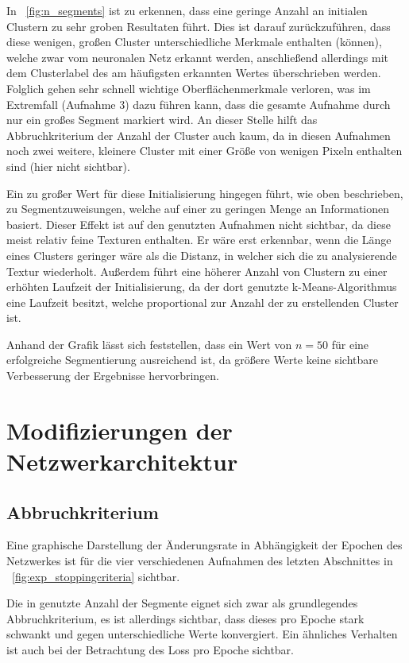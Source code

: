 In \figurename~\ref{fig:n_segments} ist zu erkennen, dass eine geringe Anzahl an initialen Clustern zu sehr groben Resultaten führt. Dies ist darauf zurückzuführen, dass diese wenigen, großen Cluster unterschiedliche Merkmale enthalten (können), welche zwar vom neuronalen Netz erkannt werden, anschließend allerdings mit dem Clusterlabel des am häufigsten erkannten Wertes überschrieben werden. Folglich gehen sehr schnell wichtige Oberflächenmerkmale verloren, was im Extremfall (\vgl Aufnahme 3) dazu führen kann, dass die gesamte Aufnahme durch nur ein großes Segment markiert wird. An dieser Stelle hilft das Abbruchkriterium der Anzahl der Cluster auch kaum, da in diesen Aufnahmen noch zwei weitere, kleinere Cluster mit einer Größe von wenigen Pixeln enthalten sind (hier nicht sichtbar).

Ein zu großer Wert für diese Initialisierung hingegen führt, wie oben beschrieben, zu Segmentzuweisungen, welche auf einer zu geringen Menge an Informationen basiert. Dieser Effekt ist auf den genutzten Aufnahmen nicht sichtbar, da diese meist relativ feine Texturen enthalten. Er wäre erst erkennbar, wenn die Länge eines Clusters geringer wäre als die Distanz, in welcher sich die zu analysierende Textur wiederholt. Außerdem führt eine höherer Anzahl von Clustern zu einer erhöhten Laufzeit der Initialisierung, da der dort genutzte k-Means-Algorithmus eine Laufzeit besitzt, welche proportional zur Anzahl der zu erstellenden Cluster ist.

Anhand der Grafik lässt sich feststellen, dass ein Wert von $n=50$ für eine erfolgreiche Segmentierung ausreichend ist, da größere Werte keine sichtbare Verbesserung der Ergebnisse hervorbringen.

\section{Modifizierungen der Netzwerkarchitektur}

\subsection{Abbruchkriterium}
\label{ssec:exp_stoppingcriteria}

Eine graphische Darstellung der Änderungsrate in Abhängigkeit der Epochen des Netzwerkes ist für die vier verschiedenen Aufnahmen des letzten Abschnittes in \figurename~\ref{fig:exp_stoppingcriteria} sichtbar.

Die in \cite{kanezaki_18} genutzte Anzahl der Segmente eignet sich zwar als grundlegendes Abbruchkriterium, es ist allerdings sichtbar, dass dieses pro Epoche stark schwankt und gegen unterschiedliche Werte konvergiert. Ein ähnliches Verhalten ist auch bei der Betrachtung des Loss pro Epoche sichtbar.

